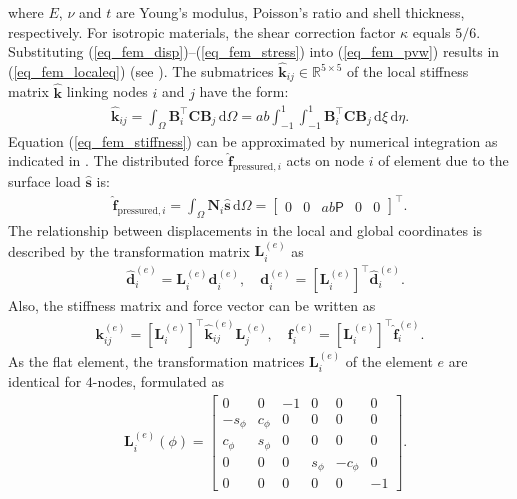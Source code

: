 \documentclass[10pt,letterpaper,journal,final,twoside,twocolumn,nofonttune]{IEEEtran}
\begin{document}
where $E$, $\nu$ and $t$ are Young's modulus, Poisson's ratio and shell thickness, respectively. For isotropic materials, the shear correction factor $\kappa$ equals $5/6$.
Substituting (\ref{eq_fem_disp})--(\ref{eq_fem_stress}) into (\ref{eq_fem_pvw}) results in (\ref{eq_fem_localeq}) (see \cite{Onate}). The submatrices $\hat{\mathbf{k}}_{ij} \in \mathbb {R}^{5 \times 5}$ of the local stiffness matrix $\hat{\mathbf{k}}$ linking nodes $i$ and $j$ have the form:
\begin{equation}
\begin{aligned}
\label{eq_fem_stiffness}
\hat{\mathbf{k}}_{ij}=\int_{\Omega} \mathbf{B}_i^\top \mathbf{C}\mathbf{B}_j \,\mathrm{d}\Omega
=ab\int_{-1}^1\int_{-1}^1 \mathbf{B}_i ^\top \mathbf{C}\mathbf{B}_j\,\mathrm{d}\xi \,\mathrm{d}\eta.
\end{aligned}
\end{equation} 
Equation (\ref{eq_fem_stiffness}) can be approximated by numerical integration as indicated in \cite{Young}.
The distributed force $\hat{\mathbf{f}}_{\text{pressured},i}$ acts on node $i$ of element due to the surface load $\hat{\mathbf{s}}$ is:
\begin{align}
\label{eq_fem_pressured}
\hat{\mathbf{f}}_{\text{pressured},i}=\int_{\Omega} \mathbf{N}_i\hat{\mathbf{s}} \,\mathrm{d}\Omega  = \begin{bmatrix}
0& 0& ab\mathsf{P}& 0& 0\end{bmatrix} ^\top.
\end{align}
The relationship between displacements in the local and global coordinates is described by the transformation matrix $\mathbf{L}^{(e)}_i$ as 
\begin{align}
\label{eq_fem_tran}
&\hat{\mathbf{d}}^{(e)}_i  = \mathbf{L}^{(e)}_i \mathbf{d}^{(e)}_i, \quad
\mathbf{d}^{(e)}_i  = [\mathbf{L}^{(e)}_i]^{\top} \hat{\mathbf{d}}^{(e)}_i.
\end{align}
Also, the stiffness matrix and force vector can be written as
\begin{align}
\mathbf{k}^{(e)}_{ij} = [\mathbf{L}^{(e)}_i]^\top\hat{\mathbf{k}}_{ij}^{(e)}\mathbf{L}^{(e)}_j, \quad
\mathbf{f}^{(e)}_{i} = [\mathbf{L}^{(e)}_i]^\top\hat{\mathbf{f}}_{i}^{(e)}.
\end{align}
As the flat element, the transformation matrices $\mathbf{L}^{(e)}_i$ of the element $e$ are identical for $4$-nodes, formulated as
\begin{equation}
\begin{aligned}
&\mathbf{L}^{(e)}_i(\phi)=
\begin{bmatrix}
0&0&-1&0&0&0\\
-s_\phi &c_\phi&0&0&0&0\\
c_\phi&s_\phi&0&0&0&0\\
0&0&0&s_\phi &-c_\phi&0\\
0&0&0&0&0&-1
\end{bmatrix}.
\end{aligned}
\end{equation}
\end{document}

